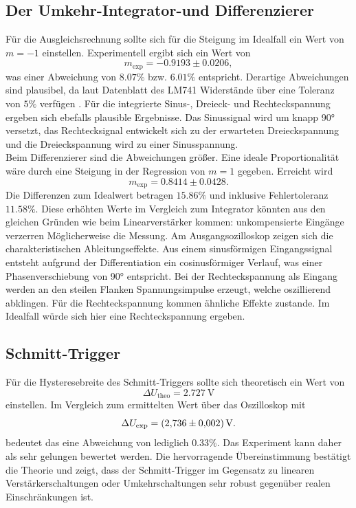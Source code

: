 \subsection{Der Umkehr-Integrator-und Differenzierer}
Für die Ausgleichsrechnung sollte sich für die Steigung im Idealfall ein Wert 
von $m=-1$ einstellen. Experimentell ergibt sich ein Wert von
\begin{equation*}
    m_{\text{exp}} = -0.9193 \pm 0.0206,
\end{equation*}
was einer Abweichung von $8.07 \%$ bzw. $6.01 \%$ entspricht. Derartige Abweichungen 
sind plausibel, da laut Datenblatt des LM741 Widerstände über eine Toleranz von 
$5 \%$ verfügen \cite{datenblatt}. Für die integrierte Sinus-, Dreieck- und 
Rechteckspannung ergeben sich ebefalls plausible Ergebnisse. Das Sinussignal 
wird um knapp 90° versetzt, das Rechtecksignal entwickelt sich zu der erwarteten 
Dreieckspannung und die Dreieckspannung wird zu einer Sinusspannung.
\vspace{0.5cm}
\\
\noindent Beim Differenzierer sind die Abweichungen größer. Eine ideale
Proportionalität wäre durch eine Steigung in der Regression von $m=1$ gegeben.
Erreicht wird 
\begin{equation*}
    m_{\text{exp}} = 0.8414 \pm 0.0428.
\end{equation*}
Die Differenzen zum Idealwert betragen $15.86 \%$ und inklusive Fehlertoleranz 
$11.58 \%$. Diese erhöhten Werte im Vergleich zum Integrator könnten aus den 
gleichen Gründen wie beim Linearverstärker kommen: unkompensierte Eingänge 
verzerren Möglicherweise die Messung. Am Ausgangsozilloskop zeigen sich die
charakteristischen Ableitungseffekte. Aus einem sinusförmigen Eingangssignal 
entsteht aufgrund der Differentiation ein cosinusförmiger Verlauf, was einer 
Phasenverschiebung von 90° entspricht. Bei der Rechteckspannung als Eingang werden
an den steilen Flanken Spannungsimpulse erzeugt, welche oszillierend abklingen.
Für die Rechteckspannung kommen ähnliche Effekte zustande. Im Idealfall würde
sich hier eine Rechteckspannung ergeben.


\subsection{Schmitt-Trigger}
Für die Hysteresebreite des Schmitt-Triggers sollte sich theoretisch ein Wert von 
\begin{equation*}
    \Delta U_{\text{theo}} = \qty{2,727}{\volt}
\end{equation*}
einstellen. Im Vergleich zum ermittelten Wert über das Oszilloskop mit
\begin{equation*}
    \Delta U_{\text{exp}} = \qty{2.736 \pm 0.002}{\volt}.
\end{equation*}
bedeutet das eine Abweichung von lediglich $0.33 \%$. Das Experiment kann daher 
als sehr gelungen bewertet werden. Die hervorragende Übereinstimmung bestätigt
die Theorie und zeigt, dass der Schmitt-Trigger im Gegensatz zu linearen
Verstärkerschaltungen oder Umkehrschaltungen sehr robust gegenüber realen
Einschränkungen ist.